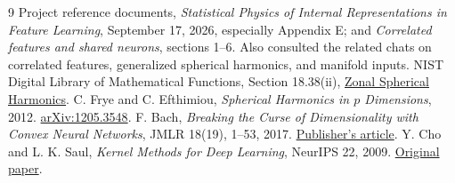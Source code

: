 \documentclass[11pt]{article}
\theoremstyle{remark}
\begin{document}
\begin{thebibliography}{9}
Project reference documents, \emph{Statistical Physics of Internal
Representations in Feature Learning}, September 17, 2026, especially
Appendix E; and \emph{Correlated features and shared neurons}, sections 1--6.
Also consulted the related chats on correlated features, generalized
spherical harmonics, and manifold inputs.
NIST Digital Library of Mathematical Functions, Section 18.38(ii),
\href{https://dlmf.nist.gov/18.38}{Zonal Spherical Harmonics}.
C. Frye and C. Efthimiou, \emph{Spherical Harmonics in $p$ Dimensions},
2012. \href{https://arxiv.org/abs/1205.3548}{arXiv:1205.3548}.
F. Bach, \emph{Breaking the Curse of Dimensionality with Convex Neural
Networks}, JMLR 18(19), 1--53, 2017.
\href{https://jmlr.org/papers/v18/14-546.html}{Publisher's article}.
Y. Cho and L. K. Saul, \emph{Kernel Methods for Deep Learning},
NeurIPS 22, 2009.
\href{https://papers.nips.cc/paper/2009/file/5751ec3e9a4feab575962e78e006250d-Paper.pdf}{Original paper}.
\end{thebibliography}
\end{document}
